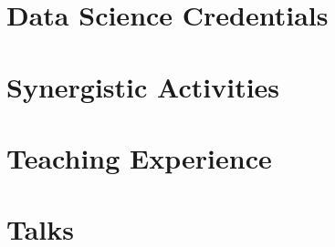 \documentclass[margin,line]{resume}
\begin{document}
\begin{resume}
    

    \section{\mysidestyle Data Science Credentials}

    

    \newpage

    \section{\mysidestyle Synergistic Activities}

    

    \section{\mysidestyle Teaching Experience}
    
    
    \section{\mysidestyle Talks}


    \newcommand\vsp{-1.5mm}
    \newcommand\talkurl[5]{\noindent \textsl{#1} \href{#4}{#5} \hfill #2 \\ #3}
    \newcommand\talk[3]{\noindent \textsl{#1}\hfill #2 \\ #3}



    


\end{resume}
\end{document}
